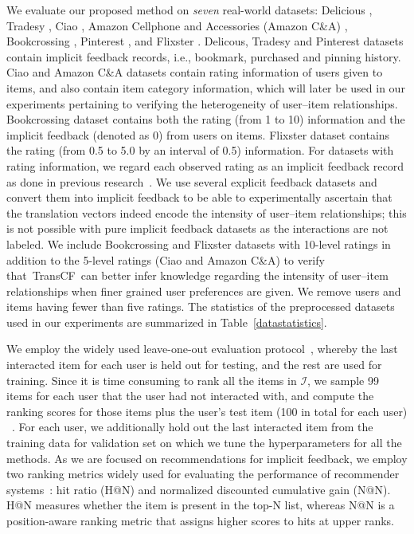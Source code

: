 \documentclass[conference]{IEEEtran}
\newcommand{\propose}{\textsf{{TransCF}}}
\begin{document}
We evaluate our proposed method on \textit{seven} real-world datasets: 
Delicious
\cite{Cantador:RecSys2011},
Tradesy
\cite{he2016vbpr},
Ciao
\cite{tang-etal12a},
Amazon Cellphone and Accessories (Amazon C\&A)
\cite{he2016ups},
Bookcrossing
\cite{ziegler2005improving},
Pinterest
\cite{geng2015learning},
and Flixster
\cite{jamali2010matrix}.
Delicous, Tradesy and Pinterest datasets contain implicit feedback records, i.e., bookmark, purchased and pinning history.
Ciao and Amazon C\&A datasets contain rating information of users given to items, and also contain item category information, which will later be used in our experiments pertaining to verifying the heterogeneity of user--item relationships.
Bookcrossing dataset contains both the rating (from 1 to 10) information and the implicit feedback (denoted as 0) from users on items. 
Flixster dataset contains the rating (from 0.5 to 5.0 by an interval of 0.5) information.
For datasets with rating information, we regard each observed rating as an implicit feedback record as done in previous research~\cite{rendle2009bpr,he2017neural,he2016vbpr,he2017translation,he2016ups,he2016fast,kabbur2013fism}.
We use several explicit feedback datasets and convert them into implicit feedback to be able to experimentally ascertain that the translation vectors indeed encode the intensity of user--item relationships; this is not possible with pure implicit feedback datasets as the interactions are not labeled.
We include Bookcrossing and Flixster datasets with 10-level ratings in addition to the 5-level ratings (Ciao and Amazon C\&A) to verify that~\propose~can better infer knowledge regarding the intensity of user--item relationships when finer grained user preferences are given.
We remove users and items having fewer than five ratings. The statistics of the preprocessed datasets used in our experiments are summarized in Table~\ref{datastatistics}.


\medskip
{}
We employ the widely used leave-one-out evaluation protocol~\cite{he2016vbpr,he2017neural,he2016fast,rendle2009bpr,he2017translation,xuedeep,he2016ups}, whereby  the last interacted item for each user is held out for testing, and the rest are used for training. Since it is time consuming to rank all the items in $\mathcal{I}$, we sample 99 items for each user that the user had not interacted with, and compute the ranking scores for those items plus the user's test item (100 in total  for each user) ~\cite{he2017neural,xuedeep}. For each user, we additionally hold out the last interacted item from the training data for validation set on which we tune the hyperparameters for all the methods.
As we are focused on recommendations for implicit feedback, we employ two ranking metrics widely used for evaluating the performance of recommender systems~\cite{he2017translation,he2017neural}: {hit ratio (H@N)} and {normalized discounted cumulative gain (N@N)}. H@N measures whether the item is present in the top-N list, whereas N@N is a position-aware ranking metric that assigns higher scores to hits at upper ranks. 
\end{document}
